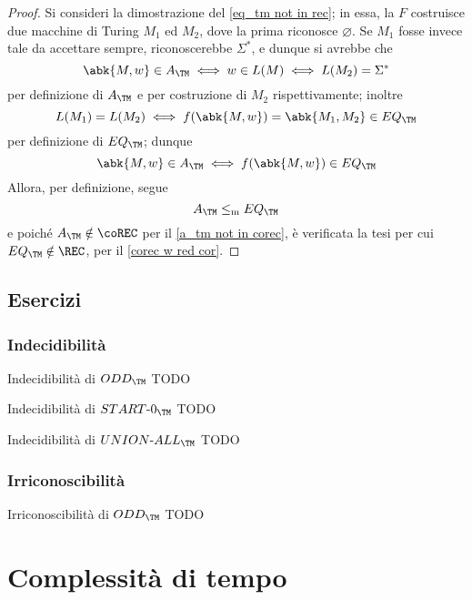 \documentclass[a4paper, 12pt]{report}
\begin{document}
    \begin{proof}
        Si consideri la dimostrazione del \cref{eq_tm not in rec}; in essa, la \TM $F$ costruisce due macchine di Turing $M_1$ ed $M_2$, dove la prima riconosce $\varnothing$. Se $M_1$ fosse invece tale da accettare sempre, riconoscerebbe $\Sigma^*$, e dunque si avrebbe che $$\abk{M, w} \in A_\TM \iff w \in L(M) \iff L(M_2) = \Sigma^*$$ per definizione di $A_\TM$ e per costruzione di $M_2$ rispettivamente; inoltre $$L(M_1)=L(M_2) \iff f(\abk{M, w}) = \abk{M_1, M_2} \in EQ_\TM$$ per definizione di $EQ_\TM$; dunque $$\abk{M, w} \in A_\TM \iff f(\abk{M, w}) \in EQ_\TM$$ Allora, per definizione, segue $$A_\TM \leq_\mathrm m EQ_\TM$$ e poiché $A_\TM \notin \coREC$ per il \cref{a_tm not in corec}, è verificata la tesi per cui $EQ_\TM \notin \REC$, per il \cref{corec w red cor}.
    \end{proof}

    \section{Esercizi}

    \subsection{Indecidibilità}
    
    \begin{framedprob}{Indecidibilità di $ODD_\TM$}
        TODO
    \end{framedprob}

    \begin{framedprob}{Indecidibilità di $START \textsf -0_\TM$}
        TODO
    \end{framedprob}

    \begin{framedprob}{Indecidibilità di $UNION \textsf -ALL_\TM$}
        TODO
    \end{framedprob}

    \subsection{Irriconoscibilità}

    \begin{framedprob}{Irriconoscibilità di $ODD_\TM$}
        TODO
    \end{framedprob}

    \chapter{Complessità di tempo}
\end{document}
